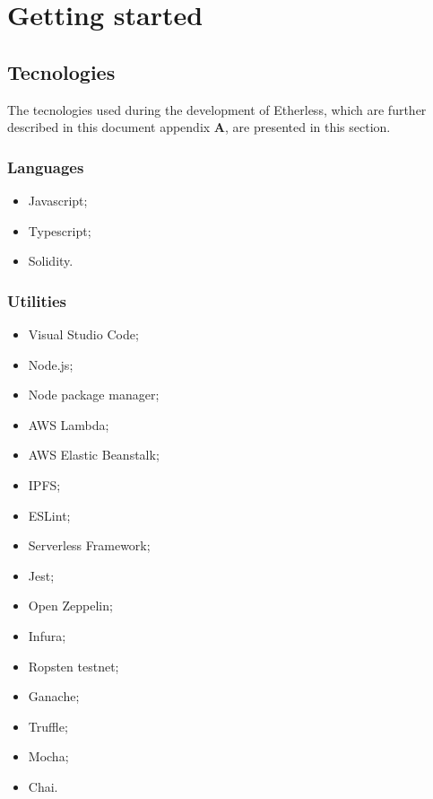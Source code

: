 \section{Getting started}
\subsection{Tecnologies}
The tecnologies used during the development of Etherless, which are further described in this document appendix \textbf{A}, are presented in this section.
\subsubsection{Languages}
\begin{itemize}
	\item Javascript;
	\item Typescript;
	\item Solidity.
\end{itemize}
\subsubsection{Utilities}
\begin{itemize}
	\item Visual Studio Code;
	\item Node.js;
	\item Node package manager;
	\item AWS Lambda;
	\item AWS Elastic Beanstalk;
	\item IPFS;
	\item ESLint;
	\item Serverless Framework;
	\item Jest;
	\item Open Zeppelin;
	\item Infura;
	\item Ropsten testnet;
	\item Ganache;
	\item Truffle;
	\item Mocha;
	\item Chai.
\end{itemize}
\pagebreak
